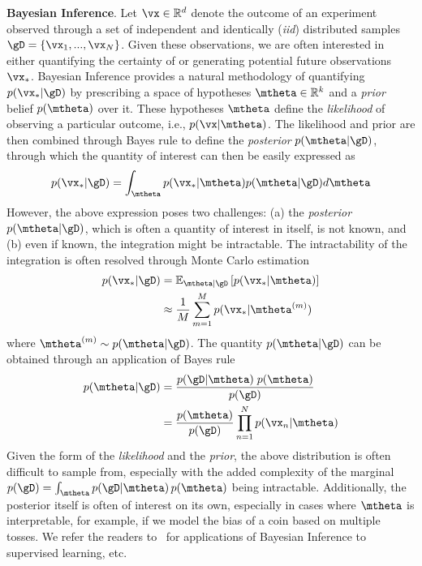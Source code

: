 \textbf{Bayesian Inference}. Let $\vx \in \mathbb{R}^d$ denote the outcome of an experiment observed through a set of independent and identically (\textit{iid}) distributed samples $\gD = \{\vx_1, ..., \vx_N\}$. Given these observations, we are often interested in either quantifying the certainty of or generating potential future observations $\vx_*$. Bayesian Inference provides a natural methodology of quantifying $p(\vx_* | \gD)$ by prescribing a space of hypotheses $\mtheta \in \mathbb{R}^k$ and a \textit{prior} belief $p(\mtheta)$ over it. These hypotheses $\mtheta$ define the \textit{likelihood} of observing a particular outcome, i.e., $p(\vx | \mtheta)$. The likelihood and prior are then combined through Bayes rule to define the \textit{posterior} $p(\mtheta | \gD)$, through which the quantity of interest can then be easily expressed as 
\begin{align}
    p(\vx_* | \gD) = \int_\mtheta p(\vx_* | \mtheta) p(\mtheta | \gD) d\mtheta
\end{align}
However, the above expression poses two challenges: (a) the \textit{posterior} $p(\mtheta | \gD)$, which is often a quantity of interest in itself, is not known, and (b) even if known, the integration might be intractable. The intractability of the integration is often resolved through Monte Carlo estimation
\begin{align}
    p(\vx_* | \gD) &= \mathbb{E}_{\mtheta | \gD} \left[p(\vx_* | \mtheta)\right] \\
    &\approx \frac{1}{M} \sum_{m=1}^M p(\vx_* | \mtheta^{(m)})
\end{align}
where $\mtheta^{(m)} \sim p(\mtheta | \gD)$. The quantity $p(\mtheta | \gD)$ can be obtained through an application of Bayes rule
\begin{align}
    \label{eq:bayes_rule}
    p(\mtheta | \gD) &= \frac{p(\gD | \mtheta)\;p(\mtheta)}{p(\gD)} \\
    &= \frac{p(\mtheta)}{p(\gD)} \prod_{n=1}^N p(\vx_n | \mtheta)
\end{align}
Given the form of the \textit{likelihood} and the \textit{prior}, the above distribution is often difficult to sample from, especially with the added complexity of the marginal $p(\gD) = \int_\mtheta p(\gD | \mtheta)\, p(\mtheta)$ being intractable. Additionally, the posterior itself is often of interest on its own, especially in cases where $\mtheta$ is interpretable, for example, if we model the bias of a coin based on multiple tosses. We refer the readers to~\citet{bishop2006pattern} for applications of Bayesian Inference to supervised learning, etc.

